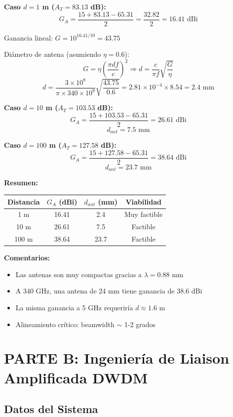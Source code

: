 \documentclass[a4paper,10pt]{article}
\begin{document}
\textbf{Caso $d = 1$ m ($A_T = 83.13$ dB):}
$$G_A = \frac{15 + 83.13 - 65.31}{2} = \frac{32.82}{2} = \boxed{16.41 \text{ dBi}}$$

Ganancia lineal: $G = 10^{16.41/10} = 43.75$

Diámetro de antena (asumiendo $\eta = 0.6$):
$$G = \eta \left(\frac{\pi d f}{c}\right)^2 \Rightarrow d = \frac{c}{\pi f}\sqrt{\frac{G}{\eta}}$$
$$d = \frac{3 \times 10^8}{\pi \times 340 \times 10^9}\sqrt{\frac{43.75}{0.6}} = 2.81 \times 10^{-4} \times 8.54 = \boxed{2.4 \text{ mm}}$$

\textbf{Caso $d = 10$ m ($A_T = 103.53$ dB):}
$$G_A = \frac{15 + 103.53 - 65.31}{2} = \boxed{26.61 \text{ dBi}}$$
$$d_{ant} = \boxed{7.5 \text{ mm}}$$

\textbf{Caso $d = 100$ m ($A_T = 127.58$ dB):}
$$G_A = \frac{15 + 127.58 - 65.31}{2} = \boxed{38.64 \text{ dBi}}$$
$$d_{ant} = \boxed{23.7 \text{ mm}}$$

\textbf{Resumen:}
\begin{center}
\begin{tabular}{cccc}
\toprule
\textbf{Distancia} & \textbf{$G_A$ (dBi)} & \textbf{$d_{ant}$ (mm)} & \textbf{Viabilidad} \\
\midrule
1 m & 16.41 & 2.4 & Muy factible \\
10 m & 26.61 & 7.5 & Factible \\
100 m & 38.64 & 23.7 & Factible \\
\bottomrule
\end{tabular}
\end{center}

\textbf{Comentarios:}
\begin{itemize}
    \item Las antenas son muy compactas gracias a $\lambda = 0.88$ mm
    \item A 340 GHz, una antena de 24 mm tiene ganancia de 38.6 dBi
    \item La misma ganancia a 5 GHz requeriría $d \approx 1.6$ m
    \item Alineamiento crítico: beamwidth $\sim$ 1-2 grados
\end{itemize}

\newpage
\section{PARTE B: Ingeniería de Liaison Amplificada DWDM}

\subsection{Datos del Sistema}
\end{document}
